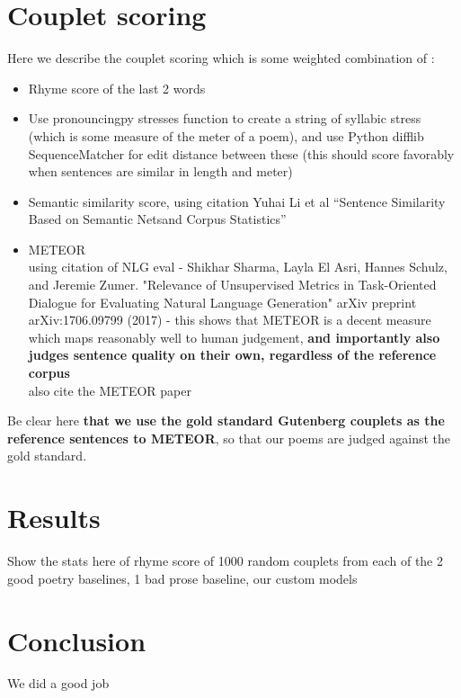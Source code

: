 \documentclass[11pt,a4paper]{article}
\begin{document}
\section{Couplet scoring}
\label{sec:coupletscore}

Here we describe the couplet scoring which is some weighted combination of \citep{Ando2005}:

\begin{itemize}
	\item
		Rhyme score of the last 2 words
	\item
		Use pronouncingpy stresses function to create a string of syllabic stress (which is some measure of the meter of a poem), and use Python difflib SequenceMatcher for edit distance between these (this should score favorably when sentences are similar in length and meter)
	\item
		Semantic similarity score, using citation Yuhai Li et al ``Sentence Similarity Based on Semantic Netsand Corpus Statistics''
	\item
		METEOR\\
		using citation of NLG eval - Shikhar Sharma, Layla El Asri, Hannes Schulz, and Jeremie Zumer. "Relevance of Unsupervised Metrics in Task-Oriented Dialogue for Evaluating Natural Language Generation" arXiv preprint arXiv:1706.09799 (2017) - this shows that METEOR is a decent measure which maps reasonably well to human judgement, \textbf{and importantly also judges sentence quality on their own, regardless of the reference corpus}\\
		also cite the METEOR paper
\end{itemize}

Be clear here \textbf{that we use the gold standard Gutenberg couplets as the reference sentences to METEOR}, so that our poems are judged against the gold standard.

\section{Results}
\label{sec:results}

Show the stats here of rhyme score of 1000 random couplets from each of the 2 good poetry baselines, 1 bad prose baseline, our custom models

\section{Conclusion}
\label{sec:conclusion}

We did a good job



\end{document}
